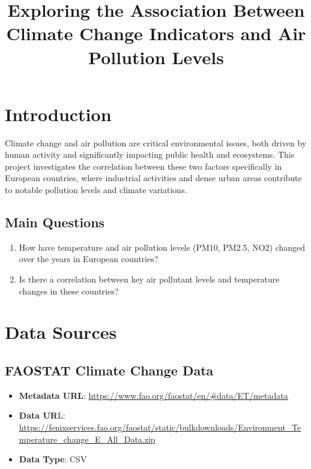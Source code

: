 \documentclass{article}
\begin{document}
\title{Exploring the Association Between Climate Change Indicators and Air Pollution Levels}
\author{}
\date{}
\maketitle

\section{Introduction}

Climate change and air pollution are critical environmental issues, both driven by human activity and significantly impacting public health and ecosystems. This project investigates the correlation between these two factors specifically in European countries, where industrial activities and dense urban areas contribute to notable pollution levels and climate variations.

\subsection{Main Questions}
\begin{enumerate}[label=\arabic*.]
    \item How have temperature and air pollution levels (PM10, PM2.5, NO2) changed over the years in European countries?
    \item Is there a correlation between key air pollutant levels and temperature changes in these countries?
\end{enumerate}

\section{Data Sources}

\subsection{FAOSTAT Climate Change Data}
\begin{itemize}
    \item \textbf{Metadata URL}: \url{https://www.fao.org/faostat/en/#data/ET/metadata}
    \item \textbf{Data UR}L: \url{https://fenixservices.fao.org/faostat/static/bulkdownloads/Environment_Temperature_change_E_All_Data.zip}
    \item \textbf{Data Type}: CSV
\end{itemize}
\end{document}
